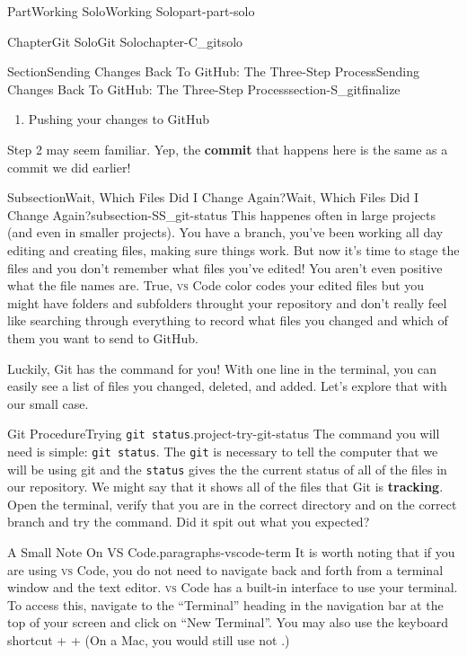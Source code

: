 \documentclass[oneside,10pt,]{book}
\newcommand{\mono}[1]{\texttt{#1}}
\newcommand{\initialism}[1]{\textsc{\MakeLowercase{#1}}}
\DeclareRobustCommand{\initialismintitle}[1]{\texorpdfstring{#1}{#1}}
\newcommand{\terminology}[1]{\textbf{#1}}
\newcommand{\kbd}[1]{\keys{{#1}}}
\begin{document}
\begin{partptx}{Part}{Working Solo}{}{Working Solo}{}{}{part-part-solo}
\begin{chapterptx}{Chapter}{Git Solo}{}{Git Solo}{}{}{chapter-C_gitsolo}
\begin{sectionptx}{Section}{Sending Changes Back To GitHub: The Three-Step Process}{}{Sending Changes Back To GitHub: The Three-Step Process}{}{}{section-S_gitfinalize}
\begin{introduction}{}
\begin{enumerate}
\item{}Pushing your changes to GitHub%
\end{enumerate}
Step 2 may seem familiar. Yep, the \terminology{commit} that happens here is the same as a commit we did earlier!%
\end{introduction}%
%
%
\typeout{************************************************}
\typeout{************************************************}
%
\begin{subsectionptx}{Subsection}{Wait, Which Files Did I Change Again?}{}{Wait, Which Files Did I Change Again?}{}{}{subsection-SS_git-status}
%
This happenes often in large projects (and even in smaller projects). You have a branch, you've been working all day editing and creating files, making sure things work. But now it's time to stage the files and you don't remember what files you've edited! You aren't even positive what the file names are. True, \initialism{VS} Code color codes your edited files but you might have folders and subfolders throught your repository and don't really feel like searching through everything to record what files you changed and which of them you want to send to GitHub.%
\par
Luckily, Git has the command for you! With one line in the terminal, you can easily see a list of files you changed, deleted, and added. Let's explore that with our small case.%
\begin{project}{Git Procedure}{Trying \mono{git status}.}{project-try-git-status}%
The command you will need is simple: \mono{git status}. The \mono{git} is necessary to tell the computer that we will be using git and the \mono{status} gives the the current status of all of the files in our repository. We might say that it shows all of the files that Git is \terminology{tracking}. Open the terminal, verify that you are in the correct directory and on the correct branch and try the command. Did it spit out what you expected?%
\end{project}%
\begin{paragraphs}{A Small Note On \initialismintitle{VS} Code.}{paragraphs-vscode-term}%
It is worth noting that if you are using \initialism{VS} Code, you do not need to navigate back and forth from a terminal window and the text editor. \initialism{VS} Code has a built-in interface to use your terminal. To access this, navigate to the ``Terminal'' heading in the navigation bar at the top of your screen and click on ``New Terminal''. You may also use the keyboard shortcut \kbd{Ctrl} + \kbd{Shift} + \kbd{\textasciigrave{}} (On a Mac, you would still use \kbd{Ctrl} not \kbd{command}.)%

\end{paragraphs}
\end{subsectionptx}
\end{sectionptx}
\end{chapterptx}
\end{partptx}
\end{document}
